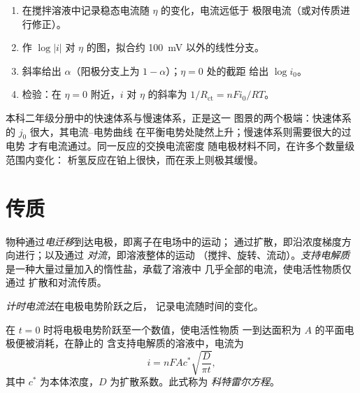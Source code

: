 \begin{method}[塔费尔分析]\label{met:b3:electrode-kinetics:tafel-analysis}
\begin{enumerate}
  \item 在搅拌溶液中记录稳态电流随 $\eta$ 的变化，电流远低于
        极限电流（或对传质进行修正）。
  \item 作 $\log|i|$ 对 $\eta$ 的图，拟合约 \qty{100}{mV} 以外的线性分支。
  \item 斜率给出 $\alpha$（阳极分支上为 $1 - \alpha$）；$\eta = 0$ 处的截距
        给出 $\log i_0$。
  \item 检验：在 $\eta = 0$ 附近，$i$ 对 $\eta$ 的斜率为 $1/R_{\mathrm{ct}} = nFi_0/RT$。
\end{enumerate}
\end{method}

本科二年级分册中的快速体系与慢速体系，正是这一
图景的两个极端：快速体系的 $j_0$ 很大，其电流–电势曲线
在平衡电势处陡然上升；慢速体系则需要很大的过电势
才有电流通过。同一反应的交换电流密度
随电极材料不同，在许多个数量级范围内变化：
析氢反应在铂上很快，而在汞上则极其缓慢。

\section{传质}

\begin{definition}[传质方式]\label{def:b3:electrode-kinetics:transport}
物种通过\emph{电迁移}到达电极，即离子在电场中的运动；
通过扩散，即沿浓度梯度方向进行；以及通过
\emph{对流}，即溶液整体的运动
（搅拌、旋转、流动）。\emph{支持电解质}
是一种大量过量加入的惰性盐，承载了溶液中
几乎全部的电流，使电活性物质仅通过
扩散和对流传质。
\end{definition}

\begin{definition}[计时电流法]\label{def:b3:electrode-kinetics:chronoamperometry}
\emph{计时电流法}在电极电势阶跃之后，
记录电流随时间的变化。
\end{definition}

\begin{theorem}[科特雷尔方程]\label{thm:b3:electrode-kinetics:cottrell}
在 $t = 0$ 时将电极电势阶跃至一个数值，使电活性物质
一到达面积为 $A$ 的平面电极便被消耗，在静止的
含支持电解质的溶液中，电流为
\[
  i = nFAc^*\sqrt{\frac{D}{\pi t}},
\]
其中 $c^*$ 为本体浓度，$D$ 为扩散系数。此式称为
\emph{科特雷尔方程}。
\end{theorem}

